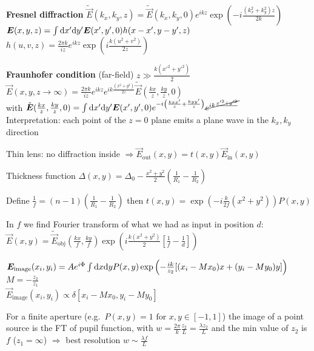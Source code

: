 \begin{squishlist}
    \item \textbf{Fresnel diffraction} $\tilde{\vec{E}}(k_x,k_y,z) = \tilde{\vec{E}}(k_x,k_y,0)e^{ikz} \exp\left({-i\frac{(k_x^2 + k_y^2)z}{2k}}\right)$\\
    $\bm{E}(x,y,z) = \int \textrm{d} x' \textrm{d} y' \bm{E}(x',y',0) h(x-x', y-y', z)$ \quad
    $h (u,v,z)= \frac{2\pi k}{iz} e^{ikz} \exp \left(i \frac{k(u^2 + v^2)}{2z}\right)$
    \item \textbf{Fraunhofer condition} (far-field) $z \gg \frac{k(x'^2 + y'^2)}{2}$ \\
    $\vec{E}(x,y,z\rightarrow \infty) = \frac{2\pi k}{iz} e^{ikz}e^{ik\frac{(x^2+y^2)}{2z}} \tilde{\vec{E}}(\frac{kx}{z}, \frac{ky}{z},0)$ \\ 
    with $\tilde{\bm{E}}(\frac{kx}{z}, \frac{ky}{z},0) = \int \textrm{d} x' \textrm{d} y'\bm{E}(x', y', 0) e^{-i \left(\frac{kxx'}{z} + \frac{kyy'}{z}\right)} \cancel{e^{ik\frac{x'^2+y'^2}{}}}$\\
    Interpretation: each point of the $z=0$ plane emits a plane wave in the $k_x,k_y$ direction
\end{squishlist}
\begin{squishlist}
    \item Thin lens: no diffraction inside $ \Rightarrow \vec{E}_{\text{out}}(x,y) = t(x,y) \vec{E}_{\text{in}}(x,y)$
    \item Thickness function $\Delta(x,y) = \Delta_0 - \frac{x^2 + y^2}{2} \left( \frac{1}{R_1} - \frac{1}{R_2} \right)$
    \item Define $\frac{1}{f} = (n-1) \left( \frac{1}{R_1} - \frac{1}{R_2} \right)$ then $t(x,y) = \exp(-i \frac{k}{2f}(x^2 + y^2)) P(x,y)$
    \item In $f$ we find Fourier transform of what we had as input in position $d$: \\
    ${\vec{E}}(x,y) = \tilde{\vec{E}}_{\text{obj}}(\frac{kx}{f},\frac{ky}{f})\exp \left(i\frac{k(x^2 + y^2)}{2}\left[\frac{1}{f}-\frac{1}{d}\right]\right)$
    \item$\bm{E}_{\text{image}}(x_i,y_i) = Ae^{i\Phi} \int \textrm{d} x \textrm{d} y P(x,y) \exp \left(-\frac{ik}{z_2} [(x_i- M x_0)x + (y_i - M y_0)y]\right)$ \quad $M = -\frac{z_2}{z_1}$ \\
    $\vec{E}_{\text{image}}(x_i,y_i) \propto \delta [x_i - M x_0, y_i - M y_0]$
    \item For a finite aperture (e.g.\ $P(x,y)=1 \text{ for } x,y \in [-1,1]$) the image of a point source is the FT of pupil function, with $w = \frac{2\pi}{k}\frac{z_2}{L} = \frac{\lambda z_2}{L}$ and the min value of $z_2$ is $f$ ($z_1 = \infty$) $\Longrightarrow$
    best resolution $w \sim \frac{\lambda f}{L}$ 
\end{squishlist}

